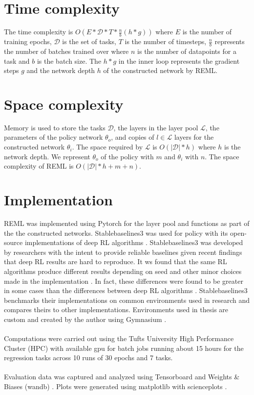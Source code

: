 \section{Time complexity}
The time complexity is $O(E * \mathcal{D} * T * \frac{n}{b}(h*g))$ 
where $E$ is the number of training epochs, $\mathcal{D}$ is the set of tasks, 
$T$ is the number of timesteps, $\frac{n}{b}$ represents the number of batches
trained over where $n$ is the number of datapoints for a task and $b$ is the
batch size. The $h*g$ in the inner loop represents the gradient steps $g$ and 
the network depth $h$ of the constructed network by REML.

\section{Space complexity}
Memory is used to store the tasks $\mathcal{D}$, the layers in the layer pool 
$\mathcal{L}$, the parameters of the policy network $\theta_{o}$, and copies of $l \in \mathcal{L}$ 
layers for the constructed network $\theta_{i}$. The space required by $\mathcal{L}$ is 
$O(|\mathcal{D}|*h)$ where $h$ is the network depth.
We represent $\theta_{o}$ of the policy with $m$ and $\theta_{i}$ with $n$.
The space complexity of REML is $O(|\mathcal{D}|*h + m +n)$.

\section{Implementation}
REML was implemented using Pytorch for the layer pool and functions as part of the 
the constructed networks. Stablebaselines3 was used for policy with its open-source 
implementations of deep RL algorithms \cite{pytorch, RafHilGleKanErnDor:21}. 
Stablebaselines3 was developed by researchers with the intent to 
provide reliable baselines given recent findings that deep RL results are hard to 
reproduce. It ws found that the same RL algorithms produce different results depending 
on seed and other minor choices made in the implementation \cite{HenIslBacPinPreMeg:18}. 
In fact, these differences were found to be greater in some cases than the differences between
deep RL algorithms \cite{EngIlySanTsi:20}. Stablebaselines3 benchmarks their implementations
on common environments used in research and compares theirs to other implementations. 
Environments used in thesis are custom and created by the author using Gymnasium \cite{gymnasium}.
\\\\
Computations were carried out using the Tufts University High Performance Cluster (HPC) 
with available gpu for batch jobs running about 15 hours for the regression tasks across 10 runs 
of 30 epochs and 7 tasks. 
\\\\
Evaluation data was captured and analyzed using Tensorboard and Weights \& Biases (wandb)
\cite{tensorflow2015-whitepaper, wandb}. Plots were generated using matplotlib with 
scienceplots \cite{matplotlib, SciencePlots}.


